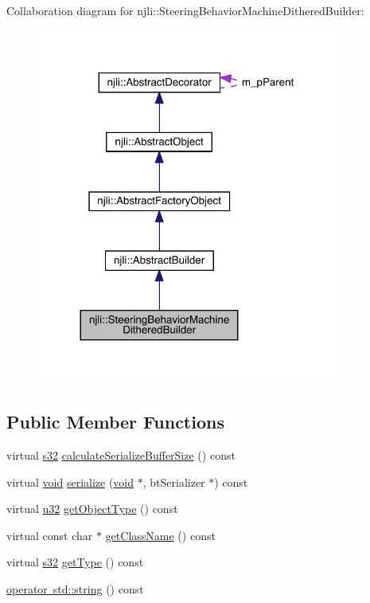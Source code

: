 Collaboration diagram for njli\+:\+:Steering\+Behavior\+Machine\+Dithered\+Builder\+:\nopagebreak
\begin{figure}[H]
\begin{center}
\leavevmode
\includegraphics[width=281pt]{classnjli_1_1_steering_behavior_machine_dithered_builder__coll__graph}
\end{center}
\end{figure}
\subsection*{Public Member Functions}
\begin{DoxyCompactItemize}
\item 
virtual \mbox{\hyperlink{_util_8h_aa62c75d314a0d1f37f79c4b73b2292e2}{s32}} \mbox{\hyperlink{classnjli_1_1_steering_behavior_machine_dithered_builder_a3a7280ffa7198b34164e73d280578f54}{calculate\+Serialize\+Buffer\+Size}} () const
\item 
virtual \mbox{\hyperlink{_thread_8h_af1e856da2e658414cb2456cb6f7ebc66}{void}} \mbox{\hyperlink{classnjli_1_1_steering_behavior_machine_dithered_builder_aa0a6e2d4c927b58257fb72e9b10736ed}{serialize}} (\mbox{\hyperlink{_thread_8h_af1e856da2e658414cb2456cb6f7ebc66}{void}} $\ast$, bt\+Serializer $\ast$) const
\item 
virtual \mbox{\hyperlink{_util_8h_a10e94b422ef0c20dcdec20d31a1f5049}{u32}} \mbox{\hyperlink{classnjli_1_1_steering_behavior_machine_dithered_builder_ade764e05d0adf7b39718660fc61f8478}{get\+Object\+Type}} () const
\item 
virtual const char $\ast$ \mbox{\hyperlink{classnjli_1_1_steering_behavior_machine_dithered_builder_a55ddd9357c21d013c041001b298f999e}{get\+Class\+Name}} () const
\item 
virtual \mbox{\hyperlink{_util_8h_aa62c75d314a0d1f37f79c4b73b2292e2}{s32}} \mbox{\hyperlink{classnjli_1_1_steering_behavior_machine_dithered_builder_a836f48abd9a02c81331b4edf8a2ffe0e}{get\+Type}} () const
\item 
\mbox{\hyperlink{classnjli_1_1_steering_behavior_machine_dithered_builder_ab5e1174628702255c567b6a7025dd2ec}{operator std\+::string}} () const
\end{DoxyCompactItemize}
